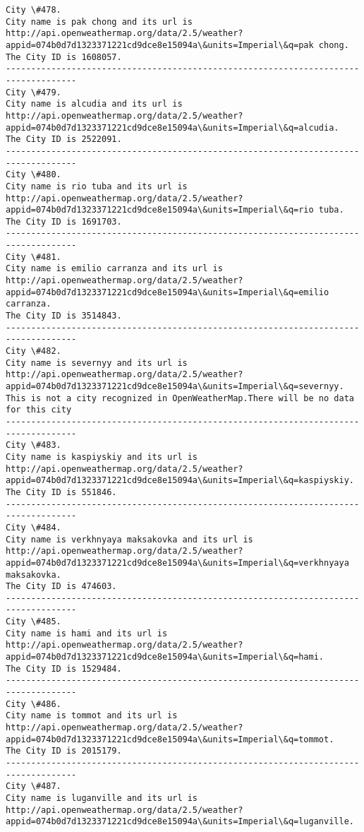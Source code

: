 \documentclass[11pt]{article}
\begin{document}
\begin{Verbatim}[commandchars=\\\{\}]
City \#478.
City name is pak chong and its url is http://api.openweathermap.org/data/2.5/weather?appid=074b0d7d1323371221cd9dce8e15094a\&units=Imperial\&q=pak chong.
The City ID is 1608057.
------------------------------------------------------------------------------------
City \#479.
City name is alcudia and its url is http://api.openweathermap.org/data/2.5/weather?appid=074b0d7d1323371221cd9dce8e15094a\&units=Imperial\&q=alcudia.
The City ID is 2522091.
------------------------------------------------------------------------------------
City \#480.
City name is rio tuba and its url is http://api.openweathermap.org/data/2.5/weather?appid=074b0d7d1323371221cd9dce8e15094a\&units=Imperial\&q=rio tuba.
The City ID is 1691703.
------------------------------------------------------------------------------------
City \#481.
City name is emilio carranza and its url is http://api.openweathermap.org/data/2.5/weather?appid=074b0d7d1323371221cd9dce8e15094a\&units=Imperial\&q=emilio carranza.
The City ID is 3514843.
------------------------------------------------------------------------------------
City \#482.
City name is severnyy and its url is http://api.openweathermap.org/data/2.5/weather?appid=074b0d7d1323371221cd9dce8e15094a\&units=Imperial\&q=severnyy.
This is not a city recognized in OpenWeatherMap.There will be no data for this city
------------------------------------------------------------------------------------
City \#483.
City name is kaspiyskiy and its url is http://api.openweathermap.org/data/2.5/weather?appid=074b0d7d1323371221cd9dce8e15094a\&units=Imperial\&q=kaspiyskiy.
The City ID is 551846.
------------------------------------------------------------------------------------
City \#484.
City name is verkhnyaya maksakovka and its url is http://api.openweathermap.org/data/2.5/weather?appid=074b0d7d1323371221cd9dce8e15094a\&units=Imperial\&q=verkhnyaya maksakovka.
The City ID is 474603.
------------------------------------------------------------------------------------
City \#485.
City name is hami and its url is http://api.openweathermap.org/data/2.5/weather?appid=074b0d7d1323371221cd9dce8e15094a\&units=Imperial\&q=hami.
The City ID is 1529484.
------------------------------------------------------------------------------------
City \#486.
City name is tommot and its url is http://api.openweathermap.org/data/2.5/weather?appid=074b0d7d1323371221cd9dce8e15094a\&units=Imperial\&q=tommot.
The City ID is 2015179.
------------------------------------------------------------------------------------
City \#487.
City name is luganville and its url is http://api.openweathermap.org/data/2.5/weather?appid=074b0d7d1323371221cd9dce8e15094a\&units=Imperial\&q=luganville.

\end{Verbatim}
\end{document}
